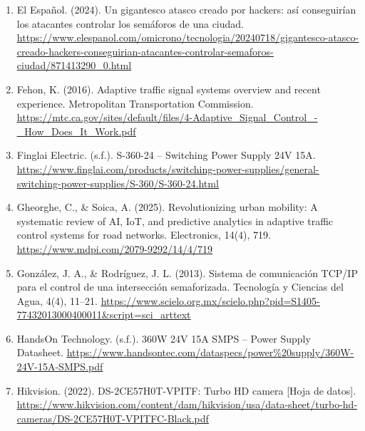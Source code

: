\documentclass[12pt,a4paper,oneside]{report}
\providecommand{\ul}[1]{\underline{#1}}
\begin{document}
\begin{enumerate}
\item
  El Español. (2024). Un gigantesco atasco creado por hackers: así conseguirían los atacantes controlar los semáforos de una ciudad. \href{https://www.elespanol.com/omicrono/tecnologia/20240718/gigantesco-atasco-creado-hackers-conseguirian-atacantes-controlar-semaforos-ciudad/871413290_0.html}{\ul{https://www.elespanol.com/omicrono/tecnologia/20240718/gigantesco-atasco-creado-hackers-conseguirian-atacantes-controlar-semaforos-ciudad/871413290\_0.html}}
\item
  Fehon, K. (2016). Adaptive traffic signal systems overview and recent experience. Metropolitan Transportation Commission. \href{https://mtc.ca.gov/sites/default/files/4-Adaptive_Signal_Control_-_How_Does_It_Work.pdf}{\ul{https://mtc.ca.gov/sites/default/files/4-Adaptive\_Signal\_Control\_-\_How\_Does\_It\_Work.pdf}}
\item
  Finglai Electric. (s.f.). S-360-24 -- Switching Power Supply 24V 15A. \href{https://www.finglai.com/products/switching-power-supplies/general-switching-power-supplies/S-360/S-360-24.html}{\ul{https://www.finglai.com/products/switching-power-supplies/general-switching-power-supplies/S-360/S-360-24.html}}
\item
  Gheorghe, C., \& Soica, A. (2025). Revolutionizing urban mobility: A systematic review of AI, IoT, and predictive analytics in adaptive traffic control systems for road networks. Electronics, 14(4), 719. \href{https://www.mdpi.com/2079-9292/14/4/719}{\ul{https://www.mdpi.com/2079-9292/14/4/719}}
\item
  González, J. A., \& Rodríguez, J. L. (2013). Sistema de comunicación TCP/IP para el control de una intersección semaforizada. Tecnología y Ciencias del Agua, 4(4), 11--21. \href{https://www.scielo.org.mx/scielo.php?pid=S1405-77432013000400011&script=sci_arttext}{\ul{https://www.scielo.org.mx/scielo.php?pid=S1405-77432013000400011\&script=sci\_arttext}}
\item
  HandsOn Technology. (s.f.). 360W 24V 15A SMPS -- Power Supply Datasheet. \href{https://www.handsontec.com/dataspecs/power\%20supply/360W-24V-15A-SMPS.pdf}{\ul{https://www.handsontec.com/dataspecs/power\%20supply/360W-24V-15A-SMPS.pdf}}
\item
  Hikvision. (2022). DS-2CE57H0T-VPITF: Turbo HD camera {[}Hoja de datos{]}. \href{https://www.hikvision.com/content/dam/hikvision/usa/data-sheet/turbo-hd-cameras/DS-2CE57H0T-VPITFC-Black.pdf}{\ul{https://www.hikvision.com/content/dam/hikvision/usa/data-sheet/turbo-hd-cameras/DS-2CE57H0T-VPITFC-Black.pdf}}

\end{enumerate}
\end{document}
